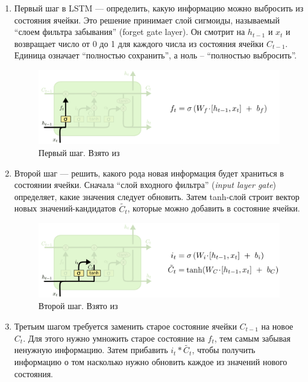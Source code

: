 \documentclass[14pt]{extarticle}
\begin{document}
\begin{enumerate}

\item
Первый шаг в LSTM --- определить, какую информацию можно выбросить из состояния ячейки. Это решение принимает слой сигмоиды, называемый “слоем фильтра забывания” (forget gate layer). Он смотрит на $h_{t-1}$  и $x_t$ и возвращает число от 0 до 1 для каждого числа из состояния ячейки $C_{t-1}$. Единица означает “полностью сохранить”, а ноль – “полностью выбросить”.

\begin{figure}[h]
	\centering
	\includegraphics[width=1\textwidth]{img/LSTM-step_1.png}
	\caption{Первый шаг. Взято из \cite{Liu2018DeepRL}}
	\label{fig:lstm-s1}
\end{figure}

\item
Второй шаг --- решить, какого рода новая информация будет храниться в состоянии ячейки. Сначала “слой входного фильтра” ({\it input layer gate}) определяет, какие значения следует обновить. Затем tanh-слой строит вектор новых значений-кандидатов $\widetilde{C_t}$, которые можно добавить в состояние ячейки.

\begin{figure}[h]
	\centering
	\includegraphics[width=1\textwidth]{img/LSTM_step_2.png}
	\caption{Второй шаг. Взято из \cite{Liu2018DeepRL}}
	\label{fig:lstm-s2}
\end{figure}

\item
Третьим шагом требуется заменить старое состояние ячейки $C_{t - 1}$  на новое $C_t$. Для этого нужно умножить старое состояние на $f_t$, тем самым забывая ненужную информацию. Затем прибавить $i_t * \widetilde{C_t}$, чтобы получить информацию о том насколько нужно обновить каждое из значений нового состояния.


\end{enumerate}
\end{document}
